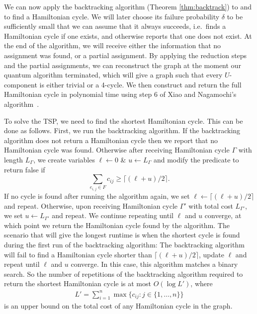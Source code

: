 We can now apply the backtracking algorithm (Theorem \ref{thm:backtrack}) to \FnPredicatethree and \FnHeuristicthree to find a Hamiltonian cycle. We will later choose its failure probability $\delta$ to be sufficiently small that we can assume that it always succeeds, i.e.\ finds a Hamiltonian cycle if one exists, and otherwise reports that one does not exist. At the end of the algorithm, we will receive either the information that no assignment was found, or a partial assignment. By applying the reduction steps and the partial assignments, we can reconstruct the graph at the moment our quantum algorithm terminated, which will give a graph such that every $U$-component is either trivial or a 4-cycle. We then construct and return the full Hamiltonian cycle in polynomial time using step $6$ of Xiao and Nagamochi's algorithm~\cite{xiao2016degree3}. %

To solve the TSP, we need to find the shortest Hamiltonian cycle. This can be done as follows. First, we run the backtracking algorithm. If the backtracking algorithm does not return a Hamiltonian cycle then we report that no Hamiltonian cycle was found. Otherwise after receiving Hamiltonian cycle $\Gamma$ with length $L_\Gamma$, we create variables $\ell \leftarrow 0$ \& $u \leftarrow L_\Gamma$ and modify the predicate to return false if
%
\begin{equation}
\sum_{e_{i,j}\in F}c_{ij} \geq \lceil(\ell + u)/2\rceil.
\end{equation}
%
If no cycle is found after running the algorithm again, we set $\ell \leftarrow \lceil(\ell + u)/2\rceil$ and repeat. Otherwise, upon receiving Hamiltonian cycle $\Gamma'$ with total cost $L_{\Gamma'}$, we set $u \leftarrow L_{\Gamma'}$ and repeat. We continue repeating until $\ell$ and $u$ converge, at which point we return the Hamiltonian cycle found by the algorithm. The scenario that will give the longest runtime is when the shortest cycle is found during the first run of the backtracking algorithm: The backtracking algorithm will fail to find a Hamiltonian cycle shorter than $\lceil(\ell + u)/2\rceil$, update $\ell$ and repeat until $\ell$ and $u$ converge. In this case, this algorithm matches a binary search. So the number of repetitions of the backtracking algorithm required to return the shortest Hamiltonian cycle is at most $O(\log L')$, where
%
%
\begin{align}
L' = \sum_{i = 1}^{n}\max \{c_{ij} \colon j \in \{1,\dots,n\} \}
\label{eqn:l}
\end{align}
%
is an upper bound on the total cost of any Hamiltonian cycle in the graph.

